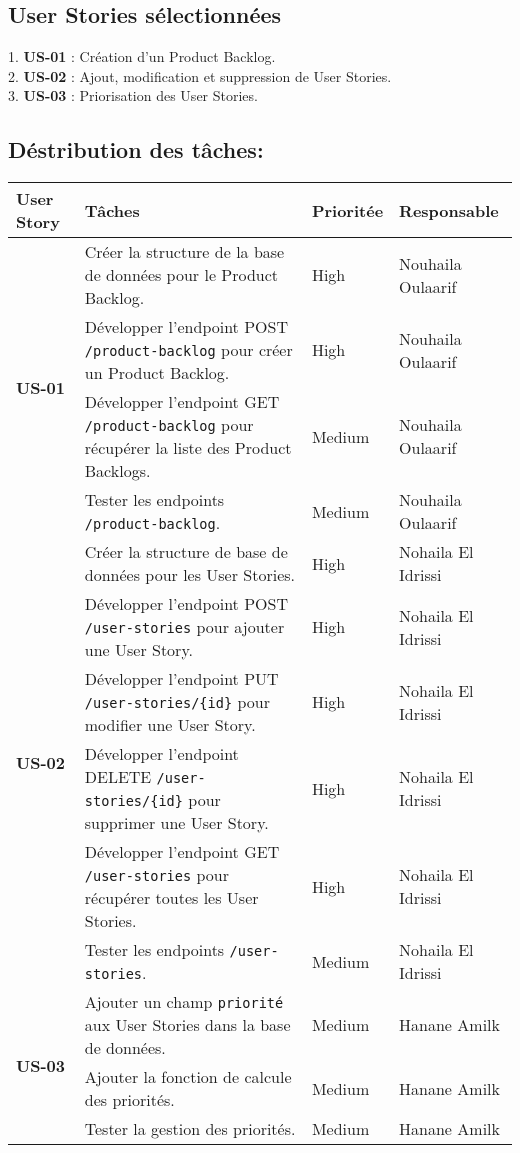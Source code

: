 \documentclass[a4paper,12pt]{article}
\begin{document}
\subsection{User Stories sélectionnées}
1. \textbf{US-01} : Création d’un Product Backlog.  \\
2. \textbf{US-02} : Ajout, modification et suppression de User Stories. \\
3. \textbf{US-03} : Priorisation des User Stories.
\subsection{Déstribution des tâches:}
\vspace{10pt}
\noindent
\begin{tabular}{|m{2cm}|m{8cm}|m{2cm}|m{4cm}|}
    \hline
    \textbf{User Story} & \textbf{Tâches} & \textbf{Prioritée} & \textbf{Responsable} \\
    \hline
    \multirow{4}{*}{\textbf{US-01}} & Créer la structure de la base de données pour le Product Backlog. & High & Nouhaila Oulaarif \\
    \cline{2-4}
    & Développer l’endpoint POST \texttt{/product-backlog} pour créer un Product Backlog. & High & Nouhaila Oulaarif \\
    \cline{2-4}
    & Développer l’endpoint GET \texttt{/product-backlog} pour récupérer la liste des Product Backlogs. & Medium & Nouhaila Oulaarif \\
    \cline{2-4}
    & Tester les endpoints \texttt{/product-backlog}. & Medium & Nouhaila Oulaarif \\
    \hline
    \multirow{6}{*}{\textbf{US-02}} & Créer la structure de base de données pour les User Stories. & High & Nohaila El Idrissi \\
    \cline{2-4}
    & Développer l’endpoint POST \texttt{/user-stories} pour ajouter une User Story. & High & Nohaila El Idrissi \\
    \cline{2-4}
    & Développer l’endpoint PUT \texttt{/user-stories/\{id\}} pour modifier une User Story. & High & Nohaila El Idrissi \\
    \cline{2-4}
    & Développer l’endpoint DELETE \texttt{/user-stories/\{id\}} pour supprimer une User Story. & High & Nohaila El Idrissi \\
    \cline{2-4}
    & Développer l’endpoint GET \texttt{/user-stories} pour récupérer toutes les User Stories. & High & Nohaila El Idrissi \\
    \cline{2-4}
    & Tester les endpoints \texttt{/user-stories}. & Medium & Nohaila El Idrissi \\
    \hline
    \multirow{3}{*}{\textbf{US-03}} & Ajouter un champ \texttt{priorité} aux User Stories dans la base de données. & Medium & Hanane Amilk \\
    \cline{2-4}
    & Ajouter la fonction de calcule des priorités. & Medium & Hanane Amilk \\
    \cline{2-4}
    & Tester la gestion des priorités. & Medium & Hanane Amilk \\
    \hline
\end{tabular}
\end{document}
